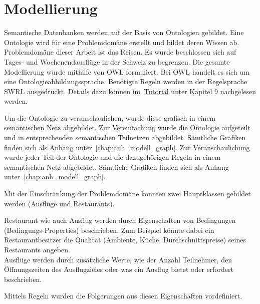 \section{Modellierung}
\label{sec:loesung_modellierung}
Semantische Datenbanken werden auf der Basis von Ontologien gebildet. Eine Ontologie wird für eine Problemdomäne erstellt und bildet deren Wissen ab. Problemdomäne dieser Arbeit ist das Reisen. Es wurde beschlossen sich auf Tages- und Wochenendausflüge in der Schweiz zu begrenzen. Die gesamte Modellierung wurde mithilfe von OWL formuliert. Bei OWL handelt es sich um eine Ontologieabbildungssprache. Benötigte Regeln werden in der Regelsprache SWRL ausgedrückt. Details dazu können im~\hyperref[sec:anhang:tutorial_dokument]{Tutorial} unter Kapitel 9 nachgelesen werden.

Um die Ontologie zu veranschaulichen, wurde diese grafisch in einem semantischen Netz abgebildet. Zur Vereinfachung wurde die Ontologie aufgeteilt und in entsprechenden semantischen Teilnetzen abgebildet. Sämtliche Grafiken finden sich als Anhang unter~\ref{chap:anh_modell_graph}.
Zur Veranschaulichung wurde jeder Teil der Ontologie und die dazugehörigen Regeln in einem semantischen Netz abgebildet. Sämtliche Grafiken finden sich als Anhang unter~\ref{chap:anh_modell_graph}.


Mit der Einschränkung der Problemdomäne konnten zwei Hauptklassen gebildet werden (Ausflüge und Restaurants).

Restaurant wie auch Ausflug werden durch Eigenschaften von Bedingungen (Bedingungs-Properties) beschrieben. Zum Beispiel könnte dabei ein Restaurantbesitzer die Qualität (Ambiente, Küche, Durchschnittspreise) seines Restaurants angeben.\\
Ausflüge werden durch zusätzliche Werte, wie der Anzahl Teilnehmer, den Öffnungszeiten des Ausflugzieles oder was ein Ausflug bietet oder erfordert beschrieben.

Mittels Regeln wurden die Folgerungen aus diesen Eigenschaften vordefiniert.


